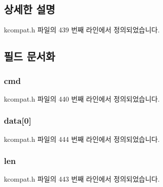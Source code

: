 \subsection{상세한 설명}


kcompat.\+h 파일의 439 번째 라인에서 정의되었습니다.



\subsection{필드 문서화}
\subsubsection[{\texorpdfstring{cmd}{cmd}}]{ cmd}\hypertarget{structethtool__eeprom_a62fe2a1dbf17d5a8561a5a7f5a97a9ba}{}\label{structethtool__eeprom_a62fe2a1dbf17d5a8561a5a7f5a97a9ba}


kcompat.\+h 파일의 440 번째 라인에서 정의되었습니다.

\subsubsection[{\texorpdfstring{data}{data}}]{ data\mbox{[}0\mbox{]}}\hypertarget{structethtool__eeprom_a2873fa0c210cc63894b6cbb14e1a1330}{}\label{structethtool__eeprom_a2873fa0c210cc63894b6cbb14e1a1330}


kcompat.\+h 파일의 444 번째 라인에서 정의되었습니다.

\subsubsection[{\texorpdfstring{len}{len}}]{ len}\hypertarget{structethtool__eeprom_a4105737bcbe35c1fd69996a085d8231a}{}\label{structethtool__eeprom_a4105737bcbe35c1fd69996a085d8231a}


kcompat.\+h 파일의 443 번째 라인에서 정의되었습니다.

